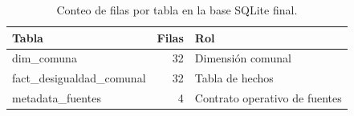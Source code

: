 \begin{table}[htbp]
\centering
\footnotesize
\caption{Conteo de filas por tabla en la base SQLite final.}
\begin{tabular}{|p{4.2cm}|r|p{6.0cm}|}
\hline
Tabla & Filas & Rol \\
\hline
dim\_comuna & 32 & Dimensión comunal \\
fact\_desigualdad\_comunal & 32 & Tabla de hechos \\
metadata\_fuentes & 4 & Contrato operativo de fuentes \\
\hline
\end{tabular}
\end{table}
